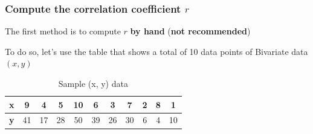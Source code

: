 \documentclass[math,code]{amznotes}
\theoremstyle{remark}
\begin{document}
\subsubsection{Compute the correlation coefficient $r$}
The first method is to compute $r$ \textbf{by hand} (\textbf{not recommended})

To do so, let's use the table that shows a total of 10 data points of Bivariate data $(x,y)$
\begin{table}[h]
\centering
\begin{tabular}{|c|c|c|c|c|c|c|c|c|c|c|}
\hline
\textbf{x} & 9 & 4 & 5 & 10 & 6 & 3 & 7 & 2 & 8 & 1 \\
\hline
\textbf{y} & 41 & 17 & 28 & 50 & 39 & 26 & 30 & 6 & 4 & 10 \\
\hline
\end{tabular}
\caption{Sample (x, y) data}
\label{tab:chapter3-xy-data}
\end{table}
\end{document}
